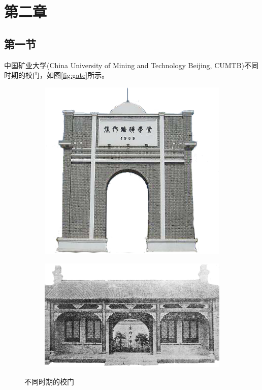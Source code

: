 \documentclass[UTF8,AutoFakeBold=1.3,fixskip = true]{ctexart}
\numberwithin{figure}{section}
\numberwithin{table}{section}
\numberwithin{equation}{section}
\begin{document}
\newpage			
\section{第二章}
	\subsection{第一节}	
		中国矿业大学(China University of Mining and Technology Beijing, CUMTB)\cite{cumtb1909}不同时期的校门，如图\ref{fig:gate}所示。

		\begin{figure}[h!]
			\begin{subfigure}[b]{.5\linewidth}
				\centering
				\includegraphics[width=0.5\linewidth]{../pic/lkxt.png}
				\label{fig:1a2}
			\end{subfigure}
			\hfill
			\begin{subfigure}[b]{.5\linewidth}
				\centering
				\includegraphics[width=0.7\linewidth]{../pic/jg.png}
				\label{fig:1b2}
			\end{subfigure}
			\caption{不同时期的校门}
			\label{fig:gate2}
		 \end{figure}
		 
\end{document}

